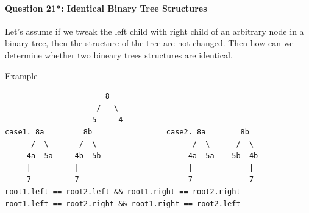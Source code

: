 \documentclass[11pt]{article}
\begin{document}
    \paragraph{Question 21*: Identical Binary Tree
Structures}\label{question-21-identical-binary-tree-structures}

Let's assume if we tweak the left child with right child of an arbitrary
node in a binary tree, then the structure of the tree are not changed.
Then how can we determine whether two bineary trees structures are
identical.

Example

\begin{verbatim}
                       8
                     /   \
                    5     4
case1. 8a         8b                 case2. 8a        8b
      /  \       /  \                      /  \      /  \
     4a  5a     4b  5b                    4a  5a    5b  4b
     |          |                         |             |
     7          7                         7             7
root1.left == root2.left && root1.right == root2.right
root1.left == root2.right && root1.right == root2.left
\end{verbatim}
\end{document}
